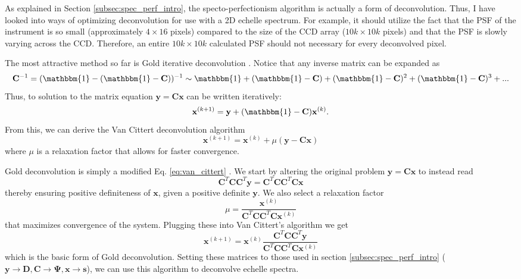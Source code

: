 \documentclass[11pt]{article}
\begin{document}
As explained in Section \ref{subsec:spec_perf_intro}, the specto-perfectionism algorithm is actually a form of deconvolution. Thus, I have looked into ways of optimizing deconvolution for use with a 2D echelle spectrum. For example, it should utilize the fact that the PSF of the instrument is so small (approximately $4 \times 16$ pixels) compared to the size of the CCD array ($10k \times 10k$ pixels) and that the PSF is slowly varying across the CCD. Therefore, an entire $10k \times 10k$ calculated PSF should not necessary for every deconvolved pixel.

The most attractive method so far is Gold iterative deconvolution \citep{Morhac2003}. Notice that any inverse matrix can be expanded as
\begin{equation}
    \mathbf{C}^{-1} = (\mathbbm{1}-(\mathbbm{1}-\mathbf{C}))^{-1} \sim \mathbbm{1} + (\mathbbm{1}-\mathbf{C}) + (\mathbbm{1}-\mathbf{C})^2 + (\mathbbm{1}-\mathbf{C})^3 + ...
    \label{eq:inverse_expansion}
\end{equation}
Thus, to solution to the matrix equation $\mathbf{y} = \mathbf{C} \mathbf{x}$ can be written iteratively:
\begin{equation}
    \mathbf{x}^{(k+1)} = \mathbf{y} + (\mathbbm{1} - \mathbf{C}) \mathbf{x}^{(k)}.
\end{equation}
From this, we can derive the Van Cittert deconvolution algorithm \citep{Xu1994}
\begin{equation}
    \mathbf{x}^{(k+1)} = \mathbf{x}^{(k)} + \mu(\mathbf{y} - \mathbf{C}\mathbf{x})
    \label{eq:van_cittert}
\end{equation}
where $\mu$ is a relaxation factor that allows for faster convergence.

Gold deconvolution is simply a modified Eq. \ref{eq:van_cittert} \citep{Morhac2003}. We start by altering the original problem $\mathbf{y}=\mathbf{C}\mathbf{x}$ to instead read
\begin{equation}
    \mathbf{C}^T\mathbf{C}\mathbf{C}^T\mathbf{y} = \mathbf{C}^T\mathbf{C}\mathbf{C}^T\mathbf{C}\mathbf{x}
\end{equation}
thereby ensuring positive definiteness of $\mathbf{x}$, given a positive definite $\mathbf{y}$. We also select a relaxation factor
\begin{equation}
    \mu = \frac{\mathbf{x}^{(k)}}{\mathbf{C}^T\mathbf{C}\mathbf{C}^T\mathbf{C}\mathbf{x}^{(k)}}
    \label{eq:relaxation}
\end{equation}
that maximizes convergence of the system. Plugging these into Van Cittert's algorithm we get
\begin{equation}
    \mathbf{x}^{(k+1)} = \mathbf{x}^{(k)} \frac{\mathbf{C}^T\mathbf{C}\mathbf{C}^T\mathbf{y}}{\mathbf{C}^T\mathbf{C}\mathbf{C}^T\mathbf{C}\mathbf{x}^{(k)}}
    \label{eq:gold_deconv}
\end{equation}
which is the basic form of Gold deconvolution. Setting these matrices to those used in section \ref{subsec:spec_perf_intro} ($\mathbf{y} \rightarrow \mathbf{D}, \mathbf{C} \rightarrow \mathbf{\Psi}, \mathbf{x} \rightarrow \mathbf{s}$), we can use this algorithm to deconvolve echelle spectra.
\end{document}
